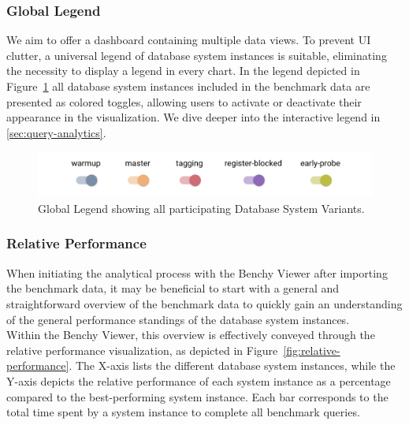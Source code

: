 \subsubsection{Global Legend}

We aim to offer a dashboard containing multiple data views. To prevent UI clutter, a universal legend of database system instances is suitable, eliminating the necessity to display a legend in every chart. In the legend depicted in Figure~\ref{fig:legend} all database system instances included in the benchmark data are presented as colored toggles, allowing users to activate or deactivate their appearance in the visualization. We dive deeper into the interactive legend in \ref{sec:query-analytics}.

\begin{figure}[h]
    \centering
    \includegraphics[width=1\linewidth]{figures/legend.png}
    \caption{Global Legend showing all participating Database System Variants.}
    \label{fig:legend}
  \end{figure}



\subsubsection{Relative Performance}

When initiating the analytical process with the Benchy Viewer after importing the benchmark data, it may be beneficial to start with a general and straightforward overview of the benchmark data to quickly gain an understanding of the general performance standings of the database system instances.\\
Within the Benchy Viewer, this overview is effectively conveyed through the relative performance visualization, as depicted in Figure~\ref{fig:relative-performance}. The X-axis lists the different database system instances, while the Y-axis depicts the relative performance of each system instance as a percentage compared to the best-performing system instance. Each bar corresponds to the total time spent by a system instance to complete all benchmark queries.

